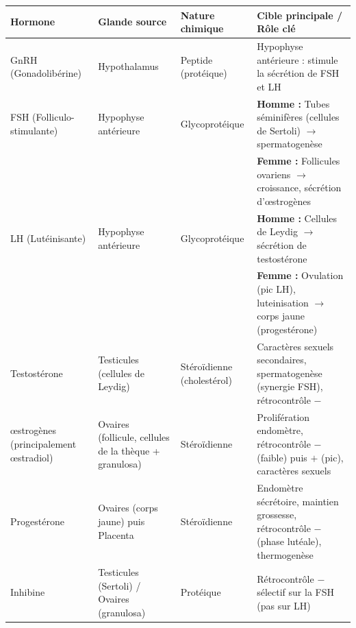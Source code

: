 \documentclass[11pt]{article}
\begin{document}
\begin{propriete}
\begin{center}
\begin{tabularx}{\linewidth}{|l|X|X|X|}\hline
\rowcolor{popblueL} \textbf{Hormone} & \textbf{Glande source} & \textbf{Nature chimique} & \textbf{Cible principale / Rôle clé} \\ \hline
GnRH (Gonadolibérine) & Hypothalamus & Peptide (protéique) & Hypophyse antérieure : stimule la sécrétion de FSH et LH \\ \hline
FSH (Folliculo-stimulante) & Hypophyse antérieure & Glycoprotéique & \textbf{Homme :} Tubes séminifères (cellules de Sertoli) $\rightarrow$ spermatogenèse \\
& & & \textbf{Femme :} Follicules ovariens $\rightarrow$ croissance, sécrétion d'\oe{}strogènes \\ \hline
LH (Lutéinisante) & Hypophyse antérieure & Glycoprotéique & \textbf{Homme :} Cellules de Leydig $\rightarrow$ sécrétion de testostérone \\
& & & \textbf{Femme :} Ovulation (pic LH), luteinisation $\rightarrow$ corps jaune (progestérone) \\ \hline
Testostérone & Testicules (cellules de Leydig) & Stéroïdienne (cholestérol) & Caractères sexuels secondaires, spermatogenèse (synergie FSH), rétrocontrôle $-$ \\ \hline
\oe{}strogènes (principalement \oe{}stradiol) & Ovaires (follicule, cellules de la thèque + granulosa) & Stéroïdienne & Prolifération endomètre, rétrocontrôle $-$ (faible) puis $+$ (pic), caractères sexuels \\ \hline
Progestérone & Ovaires (corps jaune) puis Placenta & Stéroïdienne & Endomètre sécrétoire, maintien grossesse, rétrocontrôle $-$ (phase lutéale), thermogenèse \\ \hline
Inhibine & Testicules (Sertoli) / Ovaires (granulosa) & Protéique & Rétrocontrôle $-$ sélectif sur la FSH (pas sur LH) \\ \hline
\end{tabularx}
\end{center}
\end{propriete}
\end{document}
